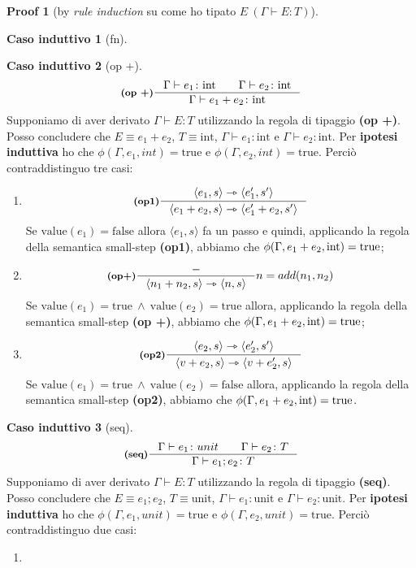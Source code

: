 \documentclass[a4paper, 10pt]{article}
\newcommand{\integer}{\textup{int}}
\theoremstyle{definition}
\newtheorem{prf}{Proof}[]
\newtheorem{ind}{Caso induttivo}
\newcommand{\infer}[4]{\inference[\textbf{#1}]{#2}{#3}#4 }
\newcommand{\srule}[2]{\langle #1 \rangle \rightarrowtriangle \langle #2 \rangle}
\begin{document}
\begin{multicols}{2}
\begin{prf}[by \textit{rule induction} su come ho tipato $ E\ (\Gamma \vdash E\colon T) $]
\begin{ind}[fn]
	\end{ind}
	\begin{ind}[op +]
		\[
			\infer{(op +)}{\Gamma \vdash e_1\colon \integer\qquad \Gamma \vdash e_2\colon \integer}{\Gamma\vdash e_1 + e_2 \colon \integer}{}
		\]
		Supponiamo di aver derivato $ \Gamma \vdash E\colon T $ utilizzando la regola di tipaggio \textbf{(op +)}. Posso concludere che $ E\equiv e_1 + e_2 $, $ T\equiv \text{int} $, $ \Gamma\vdash e_1 \colon \text{int} $ e $ \Gamma\vdash e_2 \colon \text{int} $. Per \textbf{ipotesi induttiva} ho che $ \phi(\Gamma, e_1, int)= \text{true} $ e $ \phi(\Gamma, e_2, int)= \text{true} $. Perciò contraddistinguo tre casi:
		\begin{enumerate}
			\item 
			\[
				\infer{(op1)}{\srule{e_1,s}{e_1', s'}}{\srule{e_1 + e_2,s}{e_1' + e_2,s'}}{}
			\]
			Se $ \text{value}(e_1) = \text{false} $ allora $ \langle e_1, s \rangle $ fa un passo e quindi, applicando la regola della semantica small-step \textbf{(op1)}, abbiamo che $ \phi(\Gamma, e_1 + e_2, \text{int}) = \textup{true} $;
			\item
			\[
				\infer{(op+)}{-}{\srule{n_1 + n_2,s}{n,s}}{n=add(n_1,n_2)}
			\]
			Se $ \text{value}(e_1) = \text{true}\ \wedge\ \text{value}(e_2) = \text{true} $ allora, applicando la regola della semantica small-step \textbf{(op +)}, abbiamo che $ \phi(\Gamma, e_1 + e_2, \text{int}) = \textup{true} $;
			\item 
			\[
				\infer{(op2)}{\srule{e_2,s}{e_2', s'}}{\srule{v + e_2,s}{v + e_2',s}}{}
			\]
			Se $ \text{value}(e_1) = \text{true}\ \wedge\ \text{value}(e_2) = \text{false} $ allora, applicando la regola della semantica small-step \textbf{(op2)}, abbiamo che $ \phi(\Gamma, e_1 + e_2, \text{int}) = \textup{true} $.
		\end{enumerate}
	\end{ind}
	\begin{ind}[seq]
		\[
			\infer{(seq)}{\Gamma \vdash e_1\colon unit \qquad \Gamma\vdash e_2\colon T}{\Gamma \vdash e_1;e_2\colon T}{}
		\]
		Supponiamo di aver derivato $ \Gamma \vdash E\colon T $ utilizzando la regola di tipaggio \textbf{(seq)}. Posso concludere che $ E\equiv e_1;e_2 $, $ T\equiv \text{unit} $, $ \Gamma\vdash e_1 \colon \text{unit} $ e $ \Gamma\vdash e_2 \colon \text{unit} $.  Per \textbf{ipotesi induttiva} ho che $ \phi(\Gamma, e_1, unit)= \text{true} $ e $ \phi(\Gamma, e_2, unit)= \text{true} $. Perciò contraddistinguo due casi:
		\begin{enumerate}
			\item

\end{enumerate}
\end{ind}
\end{prf}
\end{multicols}
\end{document}
